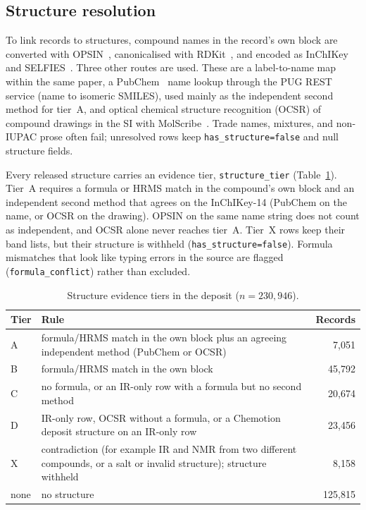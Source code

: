 \documentclass[pdflatex,sn-nature]{sn-jnl}
\begin{document}
\subsection{Structure resolution}

To link records to structures, compound names in the record's own block are converted with
OPSIN~\citep{lowe2011opsin}, canonicalised with RDKit~\citep{landrum_rdkit}, and
encoded as InChIKey~\citep{heller2013inchi} and SELFIES~\citep{krenn2020selfies}.
Three other routes are used.
These are a label-to-name map within the same paper, a PubChem~\citep{kim2023pubchem}
name lookup through the PUG REST service (name to isomeric SMILES), used mainly as the
independent second method for tier~A, and optical chemical structure recognition (OCSR)
of compound drawings in the SI with MolScribe~\citep{qian2023molscribe}.
Trade names, mixtures, and non-IUPAC prose often fail; unresolved rows keep
\texttt{has\_structure=false} and null structure fields.

Every released structure carries an evidence tier, \texttt{structure\_tier} (Table~\ref{tab:tiers}).
Tier~A requires a formula or HRMS match in the compound's own block and an
independent second method that agrees on the InChIKey-14 (PubChem on the name, or
OCSR on the drawing).
OPSIN on the same name string does not count as independent, and OCSR alone never
reaches tier~A.
Tier~X rows keep their band lists, but their structure is withheld
(\texttt{has\_structure=false}).
Formula mismatches that look like typing errors in the source are flagged
(\texttt{formula\_conflict}) rather than excluded.

\begin{table}[ht]
\caption{Structure evidence tiers in the deposit ($n=230{,}946$).}\label{tab:tiers}
\small
\begin{tabular}{@{}l>{\raggedright\arraybackslash}p{8.2cm}r@{}}
\toprule
Tier & Rule & Records \\
\midrule
A & formula/HRMS match in the own block plus an agreeing independent method (PubChem or OCSR) & 7,051 \\
B & formula/HRMS match in the own block & 45,792 \\
C & no formula, or an IR-only row with a formula but no second method & 20,674 \\
D & IR-only row, OCSR without a formula, or a Chemotion deposit structure on an IR-only row & 23,456 \\
X & contradiction (for example IR and NMR from two different compounds, or a salt or invalid structure); structure withheld & 8,158 \\
none & no structure & 125,815 \\
\bottomrule
\end{tabular}
\end{table}
\end{document}
